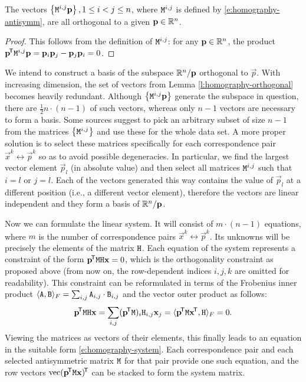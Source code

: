 \begin{lemma} \label{l:homography-orthogonal}
The vectors $\left\{ \mathtt{M}^{i, j} \mathbf{p} \right\}, 1 \leq i < j \leq n$, where $\mathtt{M}^{i,j}$ is defined by \eqref{e:homography-antisymm}, are all orthogonal to a given $\mathbf{p} \in \mathbb{R}^n$.
\end{lemma}
\begin{proof}
This follows from the definition of $\mathtt{M}^{i,j}$: for any $\mathbf{p} \in \mathbb{R}^n$, the product $\mathbf{p}^{\!\mathsf{T}} \mathtt{M}^{i, j} \mathbf{p} = \mathbf{p}_{i} \mathbf{p}_{j} - \mathbf{p}_{j} \mathbf{p}_{i} = 0$.
\end{proof}

We intend to construct a basis of the subspace $\mathbb{R}^n / \mathbf{p}$ orthogonal to $\vec p$.
With increasing dimension, the set of vectors from Lemma \ref{l:homography-orthogonal} becomes heavily redundant.
Although $\left\{ \mathtt{M}^{i, j} \mathbf{p} \right\}$ generate the subspace in question, there are $\frac {1} {2} n \cdot (n - 1)$ of such vectors, whereas only $n-1$ vectors are necessary to form a basis.
Some sources suggest to pick an arbitrary subset of size $n - 1$ from the matrices $\left\{ \mathtt{M}^{i, j} \right\}$ and use these for the whole data set.\cite{hartley03}
A more proper solution is to select these matrices specifically for each correspondence pair $\vec x^k \leftrightarrow \vec p^k$ so as to avoid possible degeneracies.
In particular, we find the largest vector element $\vec p_l$ (in absolute value) and then select all matrices $\mathtt{M}^{i, j}$ such that $i = l$ or $j = l$.
Each of the vectors generated this way contains the value of $\vec p_l$ at a different position (i.e., a different vector element), therefore the vectors are linear independent and they form a basis of $\mathbb{R}^n / \mathbf{p}$.

Now we can formulate the linear system.
It will consist of $m \cdot (n - 1)$ equations, where $m$ is the number of correspondence pairs $\vec x^k \leftrightarrow \vec p^k$.
Its unknowns will be precisely the elements of the matrix $\mathtt{H}$.
Each equation of the system represents a constraint of the form $\mathbf{p}^{\!\mathsf{T}} \mathtt{M} \mathtt{H} \mathbf{x} = 0$, which is the orthogonality constraint as proposed above (from now on, the row-dependent indices $i, j, k$ are omitted for readability).
This constraint can be reformulated in terms of the Frobenius inner product $\langle \mathtt{A}, \mathtt{B} \rangle_F = \sum_{i, j} \mathtt{A}_{i, j} \cdot \mathtt{B}_{i, j}$ and the vector outer product as follows:
$$\mathbf{p}^{\!\mathsf{T}} \mathtt{M} \mathtt{H} \mathbf{x} = \sum_{i, j} (\mathbf{p}^{\!\mathsf{T}} \mathtt{M})_i \mathtt{H}_{i, j} \mathbf{x}_j = \langle \mathbf{p}^{\!\mathsf{T}} \mathtt{M} \mathbf{x}^{\!\mathsf{T}}, \mathtt{H} \rangle_F = 0.$$
Viewing the matrices as vectors of their elements, this finally leads to an equation in the suitable form \eqref{e:homography-system}.
Each correspondence pair and each selected antisymmetric matrix $\mathtt{M}$ for that pair provide one such equation, and the row vectors $\mathrm{vec} ({\mathbf{p}}^{\!\mathsf{T}} \mathtt{M} \mathbf{x})^{\!\mathsf{T}}$ can be stacked to form the system matrix.

